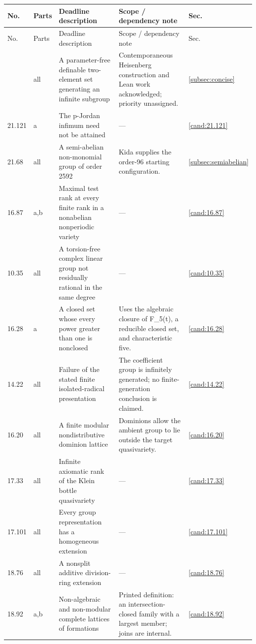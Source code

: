 \small
\begin{longtable}{@{}p{}p{}>{\raggedright\arraybackslash}p{}>{\raggedright\arraybackslash}p{}p{}@{}}
\toprule
No. & Parts & Deadline description & Scope / dependency note & Sec.\\
\midrule
\endfirsthead
\toprule
No. & Parts & Deadline description & Scope / dependency note & Sec.\\
\midrule
\endhead
\bottomrule
\endfoot
21.106 & all & A parameter-free definable two-element set generating an infinite subgroup & Contemporaneous Heisenberg construction and Lean work acknowledged; priority unassigned. & \ref{subsec:concise} \\
21.121 & a & The p-Jordan infimum need not be attained & --- & \ref{cand:21.121} \\
21.68 & all & A semi-abelian non-monomial group of order 2592 & Kida supplies the order-96 starting configuration. & \ref{subsec:semiabelian} \\
16.87 & a,b & Maximal test rank at every finite rank in a nonabelian nonperiodic variety & --- & \ref{cand:16.87} \\
10.35 & all & A torsion-free complex linear group not residually rational in the same degree & --- & \ref{cand:10.35} \\
16.28 & a & A closed set whose every power greater than one is nonclosed & Uses the algebraic closure of F\_5(t), a reducible closed set, and characteristic five. & \ref{cand:16.28} \\
14.22 & all & Failure of the stated finite isolated-radical presentation & The coefficient group is infinitely generated; no finite-generation conclusion is claimed. & \ref{cand:14.22} \\
16.20 & all & A finite modular nondistributive dominion lattice & Dominions allow the ambient group to lie outside the target quasivariety. & \ref{cand:16.20} \\
17.33 & all & Infinite axiomatic rank of the Klein bottle quasivariety & --- & \ref{cand:17.33} \\
17.101 & all & Every group representation has a homogeneous extension & --- & \ref{cand:17.101} \\
18.76 & all & A nonsplit additive division-ring extension & --- & \ref{cand:18.76} \\
18.92 & a,b & Non-algebraic and non-modular complete lattices of formations & Printed definition: an intersection-closed family with a largest member; joins are internal. & \ref{cand:18.92} \\

\end{longtable}
